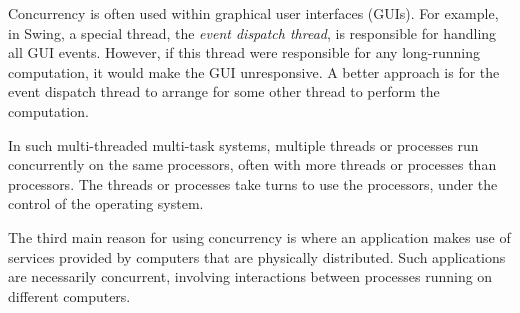 Concurrency is often used within graphical user interfaces (GUIs).  For
example, in Swing, a special thread, the \emph{event dispatch thread}, is
responsible for handling all GUI events.  However, if this thread were
responsible for any long-running computation, it would make the GUI
unresponsive.  A better approach is for the event dispatch thread to arrange
for some other thread to perform the computation. 




In such multi-threaded multi-task systems, multiple threads or processes run
concurrently on the same processors, often with more threads or processes than
processors.  The threads or processes take turns to use the processors, under
the control of the operating system.


The third main reason for using concurrency is where an application makes use
of services provided by computers that are physically distributed.  Such
applications are necessarily concurrent, involving interactions between
processes running on different computers.

